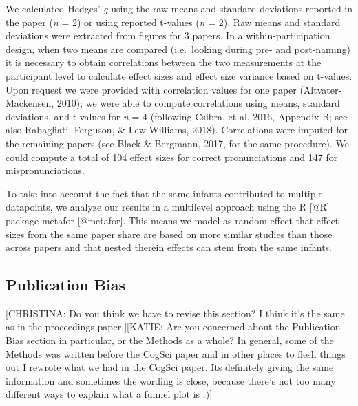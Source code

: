 \documentclass[man]{apa6}
\theoremstyle{definition}
\theoremstyle{definition}
\theoremstyle{definition}
\theoremstyle{remark}
\begin{document}
We calculated Hedges' \emph{g} using the raw means and standard
deviations reported in the paper (\emph{n} = 2) or using reported
t-values (\emph{n} = 2). Raw means and standard deviations were
extracted from figures for 3 papers. In a within-participation design,
when two means are compared (i.e.~looking during pre- and post-naming)
it is necessary to obtain correlations between the two measurements at
the participant level to calculate effect sizes and effect size variance
based on t-values. Upon request we were provided with correlation values
for one paper (Altvater-Mackensen, 2010); we were able to compute
correlations using means, standard deviations, and t-values for \emph{n}
= 4 (following Csibra, et al. 2016, Appendix B; see also Rabagliati,
Ferguson, \& Lew-Williams, 2018). Correlations were imputed for the
remaining papers (see Black \& Bergmann, 2017, for the same procedure).
We could compute a total of 104 effect sizes for correct pronunciations
and 147 for mispronunciations.

To take into account the fact that the same infants contributed to
multiple datapoints, we analyze our results in a multilevel approach
using the R {[}@R{]} package metafor {[}@metafor{]}. This means we model
as random effect that effect sizes from the same paper share are based
on more similar studies than those across papers and that nested therein
effects can stem from the same infants.

\subsection{Publication Bias}\label{publication-bias}

{[}CHRISTINA: Do you think we have to revise this section? I think it's
the same as in the proceedings paper.{]}{[}KATIE: Are you concerned
about the Publication Bias section in particular, or the Methods as a
whole? In general, some of the Methods was written before the CogSci
paper and in other places to flesh things out I rewrote what we had in
the CogSci paper. Its definitely giving the same information and
sometimes the wording is close, because there's not too many different
ways to explain what a funnel plot is :){]}
\end{document}
